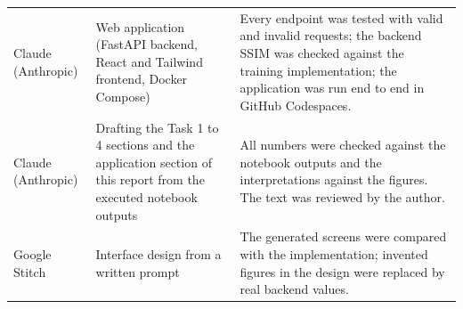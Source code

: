 \documentclass[conference]{IEEEtran}
\begin{document}
\begin{table}[t]
\begin{tabular}{@{}p{2.2cm}p{5.2cm}p{8.8cm}@{}}
Claude (Anthropic) & Web application (FastAPI backend, React and Tailwind frontend, Docker Compose) & Every endpoint was tested with valid and invalid requests; the backend SSIM was checked against the training implementation; the application was run end to end in GitHub Codespaces. \\
Claude (Anthropic) & Drafting the Task 1 to 4 sections and the application section of this report from the executed notebook outputs & All numbers were checked against the notebook outputs and the interpretations against the figures. The text was reviewed by the author. \\
Google Stitch & Interface design from a written prompt & The generated screens were compared with the implementation; invented figures in the design were replaced by real backend values. \\
\bottomrule
\end{tabular}
\end{table}
\end{document}
